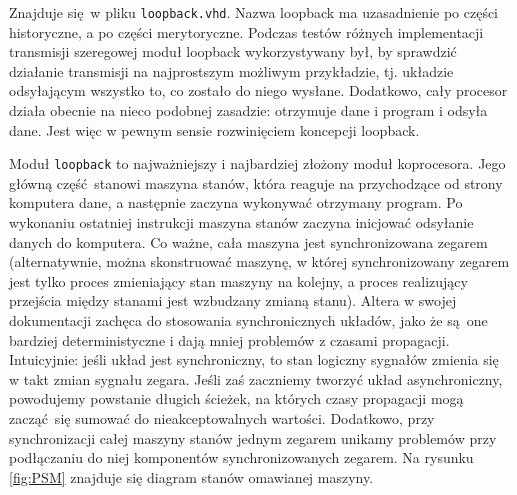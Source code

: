Znajduje się w pliku \texttt{loopback.vhd}. Nazwa loopback ma uzasadnienie po części historyczne, a po części merytoryczne. Podczas testów różnych implementacji transmisji szeregowej moduł loopback wykorzystywany był, by sprawdzić działanie transmisji na najprostszym możliwym przykładzie, tj. układzie odsyłającym wszystko to, co zostało do niego wysłane. Dodatkowo, cały procesor działa obecnie na nieco podobnej zasadzie: otrzymuje dane i program i odsyła dane. Jest więc w pewnym sensie rozwinięciem koncepcji loopback.

Moduł \texttt{loopback} to najważniejszy i najbardziej złożony moduł koprocesora. Jego główną część stanowi maszyna stanów, która reaguje na przychodzące od strony komputera dane, a następnie zaczyna wykonywać otrzymany program. Po wykonaniu ostatniej instrukcji maszyna stanów zaczyna inicjować odsyłanie danych do komputera. Co ważne, cała maszyna jest synchronizowana zegarem (alternatywnie, można skonstruować maszynę, w której synchronizowany zegarem jest tylko proces zmieniający stan maszyny na kolejny, a proces realizujący przejścia między stanami jest wzbudzany zmianą stanu). Altera w swojej dokumentacji zachęca do stosowania synchronicznych układów, jako że są one bardziej deterministyczne i dają mniej problemów z czasami propagacji. Intuicyjnie: jeśli układ jest synchroniczny, to stan logiczny sygnałów zmienia się w takt zmian sygnału zegara. Jeśli zaś zaczniemy tworzyć układ asynchroniczny, powodujemy powstanie długich ścieżek, na których czasy propagacji mogą zacząć się sumować do nieakceptowalnych wartości. Dodatkowo, przy synchronizacji całej maszyny stanów jednym zegarem unikamy problemów przy podłączaniu do niej komponentów synchronizowanych zegarem. Na rysunku \ref{fig:PSM} znajduje się diagram stanów omawianej maszyny. 

